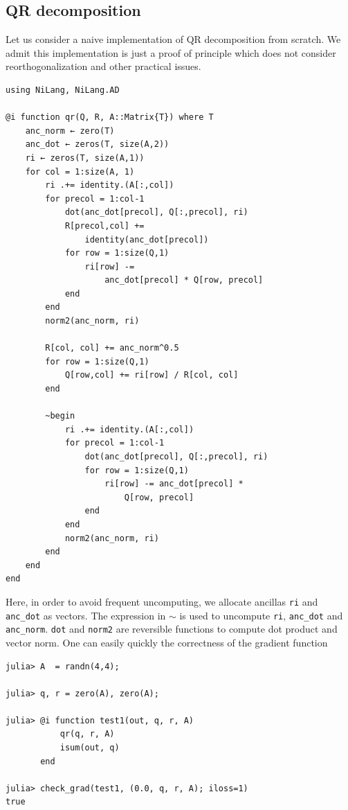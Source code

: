 \documentclass[aps,twocolumn,longbibliography,english,superscriptaddress]{revtex4-1}
\newcommand{\<}{\langle}
\renewcommand{\>}{\rangle}
\theoremstyle{definition}\newtheorem{definition}{\textit{Definition}}
\begin{document}
\subsection{QR decomposition}

Let us consider a naive implementation of QR decomposition from scratch.
We admit this implementation is just a proof of principle which does not consider reorthogonalization and other practical issues.

\begin{minipage}{.44\textwidth}
\begin{lstlisting}
using NiLang, NiLang.AD

@i function qr(Q, R, A::Matrix{T}) where T
    anc_norm ← zero(T)
    anc_dot ← zeros(T, size(A,2))
    ri ← zeros(T, size(A,1))
    for col = 1:size(A, 1)
        ri .+= identity.(A[:,col])
        for precol = 1:col-1
            dot(anc_dot[precol], Q[:,precol], ri)
            R[precol,col] += 
                identity(anc_dot[precol])
            for row = 1:size(Q,1)
                ri[row] -= 
                    anc_dot[precol] * Q[row, precol]
            end
        end
        norm2(anc_norm, ri)

        R[col, col] += anc_norm^0.5
        for row = 1:size(Q,1)
            Q[row,col] += ri[row] / R[col, col]
        end

        ~begin
            ri .+= identity.(A[:,col])
            for precol = 1:col-1
                dot(anc_dot[precol], Q[:,precol], ri)
                for row = 1:size(Q,1)
                    ri[row] -= anc_dot[precol] *
                        Q[row, precol]
                end
            end
            norm2(anc_norm, ri)
        end
    end
end
\end{lstlisting}
\end{minipage}

Here, in order to avoid frequent uncomputing, we allocate ancillas \texttt{ri} and \texttt{anc\_dot} as vectors.
The expression in $\sim$ is used to uncompute \texttt{ri}, \texttt{anc\_dot} and \texttt{anc\_norm}.
\texttt{dot} and \texttt{norm2} are reversible functions to compute dot product and vector norm.
One can easily quickly the correctness of the gradient function

\begin{minipage}{.44\textwidth}
\begin{lstlisting}
julia> A  = randn(4,4);

julia> q, r = zero(A), zero(A);

julia> @i function test1(out, q, r, A)
           qr(q, r, A)
           isum(out, q)
       end

julia> check_grad(test1, (0.0, q, r, A); iloss=1)
true
\end{lstlisting}
\end{minipage}
\end{document}
